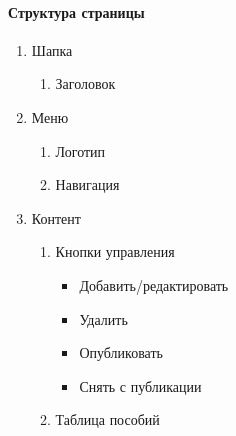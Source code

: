 \paragraph{Структура страницы}
\begin{enumerate}
	\item Шапка
	\begin{enumerate}
		\item Заголовок
	\end{enumerate}

	\item Меню
	\begin{enumerate}
		\item Логотип
		\item Навигация
	\end{enumerate}

	\item Контент
	\begin{enumerate}
		\item Кнопки управления
		\begin{itemize}
			\item Добавить/редактировать
			\item Удалить
			\item Опубликовать
			\item Снять с публикации
		\end{itemize}
		\item Таблица пособий
	\end{enumerate}
\end{enumerate}

